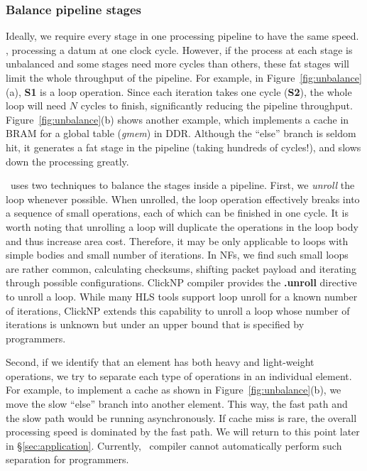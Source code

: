 \subsubsection{Balance pipeline stages}
Ideally, we require every stage in one processing pipeline to have the same speed. \ie, processing a datum at one clock cycle.
However, if the process at each stage is unbalanced and some stages need more cycles than others, these fat stages will
limit the whole throughput of the pipeline.  
For example, in Figure~\ref{fig:unbalance}(a), \textbf{S1} is a loop operation. 
Since each iteration takes one cycle (\textbf{S2}), the whole loop will need $N$ cycles to finish, significantly reducing the pipeline
throughput.
Figure~\ref{fig:unbalance}(b) shows another example, which implements a cache in BRAM for a global table (\textit{gmem}) in DDR.
Although the ``else'' branch is seldom hit, it generates a fat stage in the 
pipeline (taking hundreds of cycles!), and slows down
the processing greatly.

\name\ uses two techniques to balance the stages inside a pipeline. First, we \textit{unroll} the loop whenever possible. 
When unrolled, the loop operation effectively breaks into a sequence of small operations, each of which can be finished in one cycle.
It is worth noting that unrolling a loop will duplicate the operations in the loop body and thus increase area cost. 
Therefore, it may be only applicable to loops with simple bodies and 
small number of iterations. 
In NFs, we find such small loops are rather common, \eg calculating checksums, shifting packet payload and iterating through possible configurations.
ClickNP compiler provides the \textbf{.unroll} directive to unroll a loop. 
%
While many HLS tools support loop unroll for a known number of iterations, 
ClickNP extends this capability to unroll a loop whose  
number of iterations is unknown but under an upper bound 
that is specified by programmers.

Second, if we identify that an element has both heavy and light-weight operations, we try to separate each type of operations in an individual element.
For example, to implement a cache as shown in Figure~\ref{fig:unbalance}(b), we move the slow ``else'' branch into another element.
This way, the fast path and the slow path would be running asynchronously.
If cache miss is rare, the overall processing speed is dominated by the fast path.
We will return to this point later in \S\ref{sec:application}.
Currently, \name\ compiler cannot automatically perform such separation for 
programmers.

